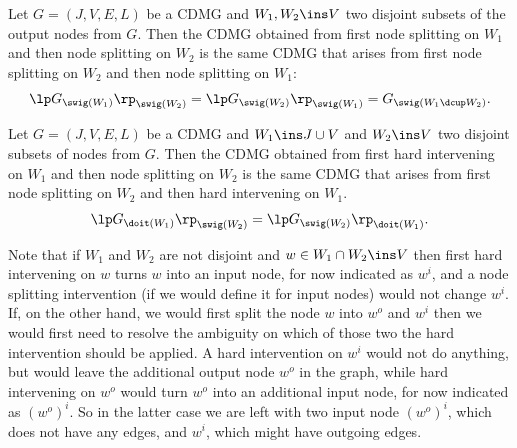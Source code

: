\begin{Lem}
   Let $G=(J,V,E,L)$ be a CDMG and $W_1, W_2 \ins V$ two disjoint subsets of the output nodes from $G$. 
   Then the CDMG obtained from first node splitting on $W_1$ and then node splitting on $W_2$ is the same CDMG that arises from first node splitting on $W_2$ and then node splitting on $W_1$:
   \[ \lp G_{\swig(W_1)} \rp_{\swig(W_2)} =  \lp G_{\swig(W_2)} \rp_{\swig(W_1)}  =  G_{\swig(W_1 \dcup W_2)}.   \]
\end{Lem}


\begin{Lem}
   Let $G=(J,V,E,L)$ be a CDMG and $W_1 \ins J \cup V$ and $W_2 \ins V$ two disjoint subsets of nodes from $G$. 
   Then the CDMG obtained from first hard intervening on $W_1$ and then node splitting on $W_2$ is the same CDMG that arises from first node splitting on $W_2$ and then hard intervening on $W_1$.
      \[ \lp G_{\doit(W_1)} \rp_{\swig(W_2)} =  \lp G_{\swig(W_2)} \rp_{\doit(W_1)}.   \]
\end{Lem}

\begin{Rem}
    Note that if $W_1$ and $W_2$ are not disjoint and $w \in W_1 \cap W_2 \ins V$ 
    then first hard intervening on $w$ turns $w$ into an input node, for now indicated as $w^i$, and a node splitting intervention (if we would define it for input nodes) would not change $w^i$.
    If, on the other hand, we would first split the node $w$ into $w^o$ and $w^i$ then we would first need to resolve the ambiguity on which of those two the hard intervention should be applied. A hard intervention on $w^i$ would not do anything, but would leave the additional output node $w^o$ in the graph, while hard intervening on $w^o$ would turn $w^o$ into an additional input node, for now indicated as $(w^o)^i$. So in the latter case we are left with two input node $(w^o)^i$, which does not have any edges, and $w^i$, which might have outgoing edges.
\end{Rem}

